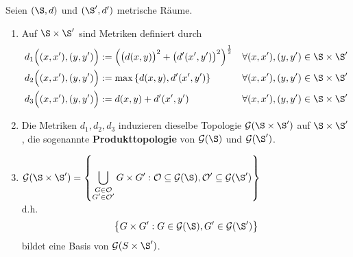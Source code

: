\begin{satz}\label{Satz2.10} %
Seien $(\S,d)$ und $(\S',d')$ metrische Räume.
\begin{enumerate}[label={(\arabic*)}]
\item Auf $\S\times\S'$ sind Metriken definiert durch
\begin{align*}
d_1\Big((x,x'),(y,y')\Big)&:=\left( \big(d(x,y)\big)^2+\big(d'(x',y')\big)^2\right)^{\frac{1}{2}} &\forall(x,x'),(y,y')\in \S\times\S'\\
d_2\Big((x,x'),(y,y')\Big)&:=\max \left\lbrace d(x,y),d'(x',y')\right\rbrace &\forall(x,x'),(y,y')\in \S\times\S'\\
d_3\Big((x,x'),(y,y')\Big)&:=d(x,y)+d'(x',y') &\forall(x,x'),(y,y')\in \S\times\S'
\end{align*}
\item Die Metriken $d_1,d_2,d_3$ induzieren dieselbe Topologie $\mathcal{G}(\S\times \S')$ auf $\S\times\S'$, die sogenannte \textbf{Produkttopologie} von $\mathcal{G}(\S)$ und $\mathcal{G}(\S')$.
\item $\begin{aligned}
\mathcal{G}(\S\times\S')=\left\lbrace\bigcup\limits_{\begin{subarray}{c}G\in\mathcal{O}\\ G'\in\mathcal{O}'\end{subarray}}G\times G':\mathcal{O}\subseteq\mathcal{G}(\S),\mathcal{O}'\subseteq\mathcal{G}(\S')\right\rbrace
\end{aligned}$\\
d.h.
\begin{align*}
\big\lbrace G\times G':G\in\mathcal{G}(\S),G'\in\mathcal{G}(\S')\big\rbrace
\end{align*}
bildet eine Basis von $\mathcal{G}(S\times\S')$.
\end{enumerate}
\end{satz}
